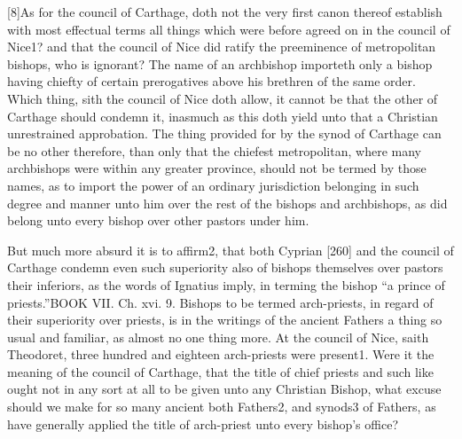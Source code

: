 [8]As for the council of Carthage, doth not the very first canon thereof establish with most effectual terms all things which were before agreed on in the council of Nice1? and that the council of Nice did ratify the preeminence of metropolitan bishops, who is ignorant? The name of an archbishop importeth only a bishop having chiefty of certain prerogatives above his brethren of the same order. Which thing, sith the council of Nice doth allow, it cannot be that the other of Carthage should condemn it, inasmuch as this doth yield unto that a Christian unrestrained approbation. The thing provided for by the synod of Carthage can be no other therefore, than only that the chiefest metropolitan, where many archbishops were within any greater province, should not be termed by those names, as to import the power of an ordinary jurisdiction belonging in such degree and manner unto him over the rest of the bishops and archbishops, as did belong unto every bishop over other pastors under him.

But much more absurd it is to affirm2, that both Cyprian [260] and the council of Carthage condemn even such superiority also of bishops themselves over pastors their inferiors, as the words of Ignatius imply, in terming the bishop “a prince of priests.”BOOK VII. Ch. xvi. 9. Bishops to be termed arch-priests, in regard of their superiority over priests, is in the writings of the ancient Fathers a thing so usual and familiar, as almost no one thing more. At the council of Nice, saith Theodoret, three hundred and eighteen arch-priests were present1. Were it the meaning of the council of Carthage, that the title of chief priests and such like ought not in any sort at all to be given unto any Christian Bishop, what excuse should we make for so many ancient both Fathers2, and synods3 of Fathers, as have generally applied the title of arch-priest unto every bishop’s office?

